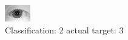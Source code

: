 \begin{figure}[h!]
\begin{center}
\includegraphics[width=0.60\columnwidth]{figures/ID1198_class_2_target_3.png}
\end{center}
\caption{ Classification: 2 actual target: 3}
\label{fig:ID1198_class_2_target_3}
\end{figure}
